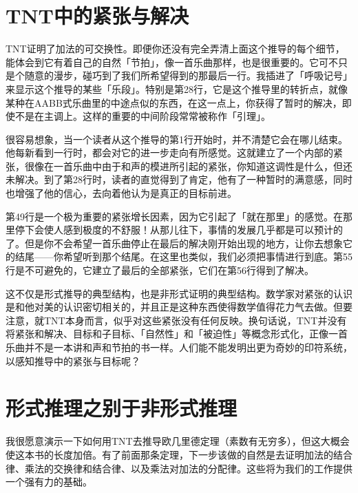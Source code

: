 \documentclass[
  12pt,
  twoside,
  openright,
  oldfontcommands,
]{memoir}
\begin{document}
\section{TNT中的紧张与解决}

TNT证明了加法的可交换性。即便你还没有完全弄清上面这个推导的每个细节，能体会到它有着自己的自然「节拍」，像一首乐曲那样，也是很重要的。它可不只是个随意的漫步，碰巧到了我们所希望得到的那最后一行。我插进了「呼吸记号」来显示这个推导的某些「乐段」。特别是第28行，它是这个推导里的转折点，就像某种在AABB式乐曲里的中途点似的东西，在这一点上，你获得了暂时的解决，即使不是在主调上。这样的重要的中间阶段常常被称作「引理」。

很容易想象，当一个读者从这个推导的第1行开始时，并不清楚它会在哪儿结束。他每新看到一行时，都会对它的进一步走向有所感觉。这就建立了一个内部的紧张，很像在一首乐曲中由于和声的模进所引起的紧张，你知道这调性是什么，但还未解决。到了第28行时，读者的直觉得到了肯定，他有了一种暂时的满意感，同时也增强了他的信心，去向着他认为是真正的目标前进。

第49行是一个极为重要的紧张增长因素，因为它引起了「就在那里」的感觉。在那里停下会使人感到极度的不舒服！从那儿往下，事情的发展几乎都是可以预计的了。但是你不会希望一首乐曲停止在最后的解决刚开始出现的地方，让你去想象它的结尾------你希望听到那个结尾。在这里也类似，我们必须把事情进行到底。第55行是不可避免的，它建立了最后的全部紧张，它们在第56行得到了解决。

这不仅是形式推导的典型结构，也是非形式证明的典型结构。数学家对紧张的认识是和他对美的认识密切相关的，并且正是这种东西使得数学值得花力气去做。但要注意，就TNT本身而言，似乎对这些紧张没有任何反映。换句话说，TNT并没有将紧张和解决、目标和子目标、「自然性」和「被迫性」等概念形式化，正像一首乐曲并不是一本讲和声和节拍的书一样。人们能不能发明出更为奇妙的印符系统，以感知推导中的紧张与目标呢？

\section{形式推理之别于非形式推理}

我很愿意演示一下如何用TNT去推导欧几里德定理（素数有无穷多），但这大概会使这本书的长度加倍。有了前面那条定理，下一步该做的自然是去证明加法的结合律、乘法的交换律和结合律、以及乘法对加法的分配律。这些将为我们的工作提供一个强有力的基础。
\end{document}
